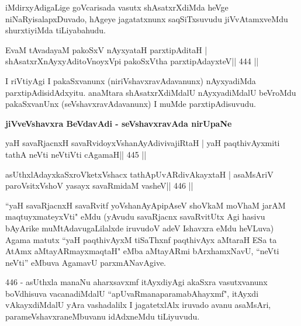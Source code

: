 \begin{artha}
iMdirxyAdigaLige goVcarisada vasutx shAsatxrXdiMda heVge niNaRyisalapxDuvado, hAgeye jagatatxnunx saqSiTxsuvudu jiVvAtamxveMdu shurxtiyiMda tiLiyabahudu.
\end{artha}


\begin{shl}
EvaM tAvadayaM pakoSxV nAyxyataH parxtipAditaH |
shAsatxrXnAyxyAditoV\s noyxV\s pi pakoSxV\s tha parxtipAdayxteV\hfill || 444 ||
\end{shl}

\begin{artha}
I riVtiyAgi I pakaSxvanunx (niriVshavxravAdavanunx) nAyxyadiMda parxtipAdisidAdxyitu. anaMtara shAsatxrXdiMdalU nAyxyadiMdalU beVroMdu pakaSxvanUnx (seVshavxravAdavanunx) I muMde parxtipAdisuvudu.
\end{artha}

\medskip
\centerline{\Large{\textbf{jiVveVshavxra BeVdavAdi - seVshavxravAda nirUpaNe}}}

\medskip


\begin{shl}
yaH savaRjacnxH savaRvidoyxV\s shanAyAdivivajiRtaH |
yaH paqthivAyxmiti tathA neVti neVtiVti cA\s\s gamaH\hfill || 445 ||
\end{shl}

\begin{shl}
asUthxlAdayxkaSxroVketxVshacx tathA\s pUvARdivAkayxtaH |
asaMsAriV paroV\s sitxVshoV yasayx savaRmidaM vasheV\hfill || 446 ||
\end{shl}

\begin{artha}
``yaH savaRjacnxH savaRvitf yoV\s shanAyApipAseV shoVkaM moVhaM
  jarAM maqtuyxmateyxVti" eMdu (yAvudu savaRjacnx savaRvitUtx Agi
  hasivu bAyArike muMtAdavugaLilalxde iruvudoV adeV Ishavxra eMdu
  heVLuva) Agama matutx ``yaH paqthivAyxM tiSaThxnf paqthivAyx aMtaraH
   \mdash   \mdash   \mdash  ESa ta AtAmx aMtayARmayxmaqtaH" eMba
  aMtayARmi bArxhamxNavU, ``neVti neVti'' eMbuva AgamavU
  parxmANavAgive. 
  
  446 - asUthxla manaNu aharxsavxmf itAyxdiyAgi akaSxra
  vasutxvanunx boVdhisuva vacanadiMdalU ``apUvaRmanaparamabAhayxmf", 
  itAyxdi vAkayxdiMdalU yAra vashadalilx I jagatetxlAlx
  iruvado avanu asaMsAri, parameVshavxraneMbuvanu idAdxneMdu tiLiyuvudu.
\end{artha}

